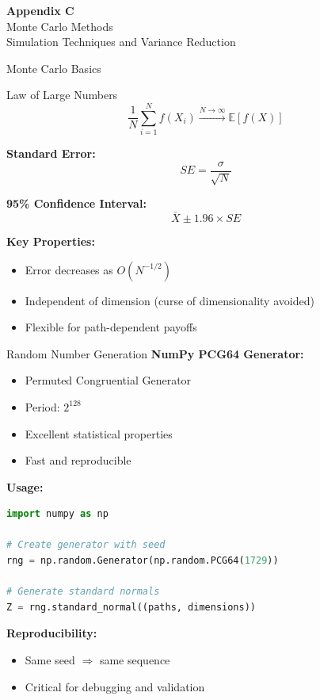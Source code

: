 \documentclass[aspectratio=169,11pt]{beamer}
\begin{document}

\begin{frame}{}
\begin{center}
\Huge\textbf{Appendix C}\\[1cm]
\Large Monte Carlo Methods\\[0.5cm]
\normalsize Simulation Techniques and Variance Reduction
\end{center}
\end{frame}

\begin{frame}{Monte Carlo Basics}
\begin{block}{Law of Large Numbers}
\[
\frac{1}{N}\sum_{i=1}^{N} f(X_i) \xrightarrow{N\to\infty} \mathbb{E}[f(X)]
\]
\end{block}

\textbf{Standard Error:}
\[
SE = \frac{\sigma}{\sqrt{N}}
\]

\textbf{95\% Confidence Interval:}
\[
\bar{X} \pm 1.96 \times SE
\]

\textbf{Key Properties:}
\begin{itemize}
    \item Error decreases as $O(N^{-1/2})$
    \item Independent of dimension (curse of dimensionality avoided)
    \item Flexible for path-dependent payoffs
\end{itemize}
\end{frame}

\begin{frame}[fragile]{Random Number Generation}
\textbf{NumPy PCG64 Generator:}
\begin{itemize}
    \item Permuted Congruential Generator
    \item Period: $2^{128}$
    \item Excellent statistical properties
    \item Fast and reproducible
\end{itemize}

\textbf{Usage:}
\begin{lstlisting}[language=Python]
import numpy as np

# Create generator with seed
rng = np.random.Generator(np.random.PCG64(1729))

# Generate standard normals
Z = rng.standard_normal((paths, dimensions))
\end{lstlisting}

\textbf{Reproducibility:}
\begin{itemize}
    \item Same seed $\Rightarrow$ same sequence
    \item Critical for debugging and validation
\end{itemize}
\end{frame}
\end{document}
